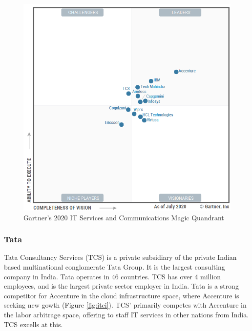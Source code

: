\begin{figure}[h!]
  \includegraphics[width=\textwidth]{img/it_services_communications}
  \caption{Gartner's 2020 IT Services and Communications Magic Quandrant}
\label{fig:itsc}
\end{figure}

\subsubsection{Tata}

Tata Consultancy Services (TCS) is a private subsidiary of the private Indian based multinational conglomerate Tata Group. It is the largest consulting company in India. Tata operates in 46 countries. TCS has over 4 million employees, and is the largest private sector employer in India. Tata is a strong competitor for Accenture in the cloud infrastructure space, where Accenture is seeking new gowth (Figure \ref{fig:itci}). TCS' primarily competes with Accenture in the labor arbitrage space, offering to staff IT services in other nations from India. TCS excells at this.



